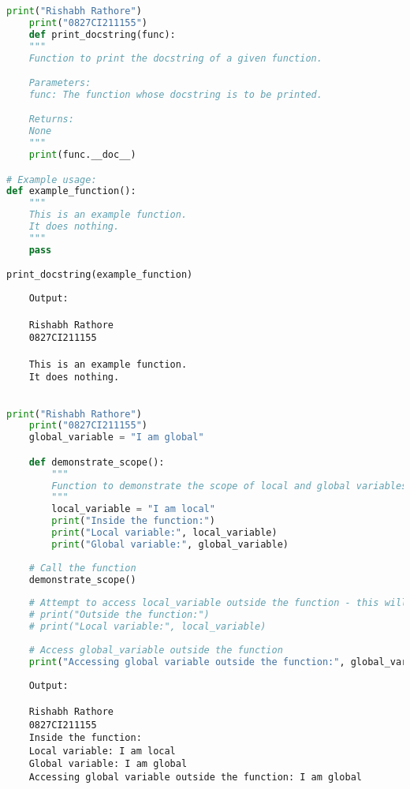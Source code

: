 \documentclass{report}
\begin{document}
\newpage


\sol 
\begin{lstlisting}[language=Python]
	print("Rishabh Rathore")
	print("0827CI211155")
	def print_docstring(func):
    """
    Function to print the docstring of a given function.

    Parameters:
    func: The function whose docstring is to be printed.

    Returns:
    None
    """
    print(func.__doc__)

# Example usage:
def example_function():
    """
    This is an example function.
    It does nothing.
    """
    pass

print_docstring(example_function)

\end{lstlisting}

\begin{verbatim}
	Output:

	Rishabh Rathore
	0827CI211155

    This is an example function.
    It does nothing.


\end{verbatim}

\newpage


\sol 
\begin{lstlisting}[language=Python]
	print("Rishabh Rathore")
	print("0827CI211155")
	global_variable = "I am global"

	def demonstrate_scope():
		"""
		Function to demonstrate the scope of local and global variables.
		"""
		local_variable = "I am local"
		print("Inside the function:")
		print("Local variable:", local_variable)
		print("Global variable:", global_variable)
	
	# Call the function
	demonstrate_scope()
	
	# Attempt to access local_variable outside the function - this will raise an error
	# print("Outside the function:")
	# print("Local variable:", local_variable)
	
	# Access global_variable outside the function
	print("Accessing global variable outside the function:", global_variable)


\end{lstlisting}

\begin{verbatim}
	Output:

	Rishabh Rathore
	0827CI211155
	Inside the function:
	Local variable: I am local
	Global variable: I am global
	Accessing global variable outside the function: I am global

\end{verbatim}
\end{document}
